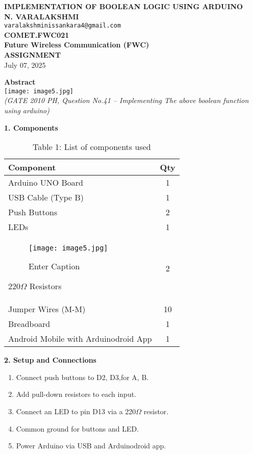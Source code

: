\documentclass[12pt]{article}
\begin{document}
\begin{center}
    \textbf{\Large IMPLEMENTATION OF BOOLEAN LOGIC USING ARDUINO} \\[10pt]
    \textbf{N. VARALAKSHMI} \\
    \texttt{varalakshminissankara4@gmail.com} \\
    \textbf{COMET.FWC021} \\
    \textbf{Future Wireless Communication (FWC)} \\
    \textbf{ASSIGNMENT} \\[5pt]
    July 07, 2025
\end{center}
\vspace{1em}

\begin{multicols}{2}

\noindent\textbf{Abstract} \\[0.5em]
\texttt{[image: image5.jpg]} \\[0.5em]
\textit{(GATE 2010 PH, Question No.41 – Implementing The above boolean function using arduino)}

\vspace{1em}
\noindent\textbf{1. Components}
\begin{table}[H]
\small
\centering
\begin{tabular}{|p{4.2cm}|c|}
\hline
\textbf{Component} & \textbf{Qty} \\
\hline
Arduino UNO Board & 1 \\


USB Cable (Type B) & 1 \\
Push Buttons & 2 \\
LEDs & 1 \\
\begin{figure}
    \centering
    \texttt{[image: image5.jpg]}
    \caption{Enter Caption}
\end{figure}
220$\Omega$ Resistors & 2 \\
Jumper Wires (M-M) & 10 \\
Breadboard & 1 \\
Android Mobile with Arduinodroid App & 1 \\
\hline
\end{tabular}
\caption*{Table 1: List of components used}
\end{table}

\vspace{1em}
\noindent\textbf{2. Setup and Connections}
\begin{enumerate}
    \item Connect push buttons to D2, D3,for A, B.
    \item Add pull-down resistors to each input.
    \item Connect an LED to pin D13 via a 220$\Omega$ resistor.
    \item Common ground for buttons and LED.
    \item Power Arduino via USB and Arduinodroid app.
\end{enumerate}


\end{multicols}
\end{document}
